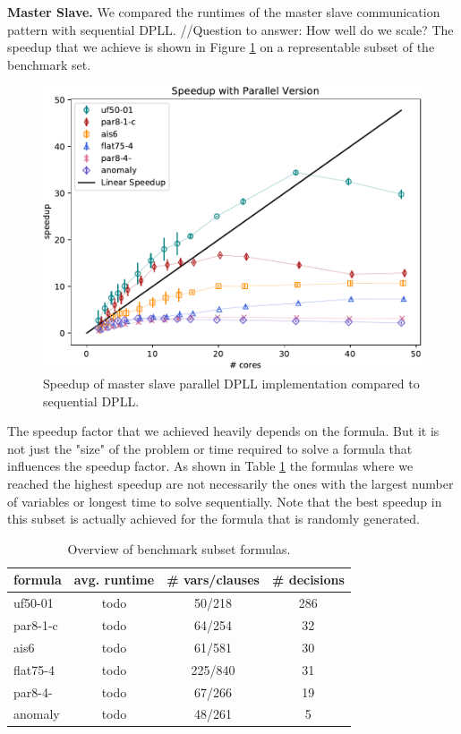 \documentclass[letterpaper]{article}
\newcommand{\mypar}[1]{{\bf #1.}}
\begin{document}
\mypar{Master Slave}
We compared the runtimes of the master slave communication pattern with sequential DPLL.
//Question to answer: How well do we scale?
The speedup that we achieve is shown in Figure \ref{fig:dpll_parallel_speedup} on a representable subset of the benchmark set.
\begin{figure}
    \centering
    \includegraphics[width=\columnwidth]{figures/dpll_scaling_parallel}
    \caption{Speedup of master slave parallel DPLL implementation compared to sequential DPLL.
    \label{fig:dpll_parallel_speedup}}
\end{figure}
The speedup factor that we achieved heavily depends on the formula.
But it is not just the "size" of the problem or time required to solve a formula that influences the speedup factor.
As shown in Table \ref{tab:cnfs_parallel} the formulas where we reached the highest speedup are not necessarily the ones with the largest number of variables or longest time to solve sequentially.
Note that the best speedup in this subset is actually achieved for the formula that is randomly generated.

\begin{table}
    \centering
    \begin{tabular}{|l|c|c|c|}
        \hline
        formula & avg. runtime & \# vars/clauses & \# decisions \\
        \hline
        \hline
        uf50-01 & todo & 50/218 & 286\\
        \hline
        par8-1-c & todo & 64/254 & 32 \\
        \hline
        ais6 & todo & 61/581 & 30 \\
        \hline
        flat75-4 & todo & 225/840 & 31\\
        \hline
        par8-4- & todo & 67/266 & 19 \\
        \hline
        anomaly & todo & 48/261 & 5 \\
        \hline
    \end{tabular}
    \caption{Overview of benchmark subset formulas.}
    \label{tab:cnfs_parallel}
\end{table}
\end{document}
